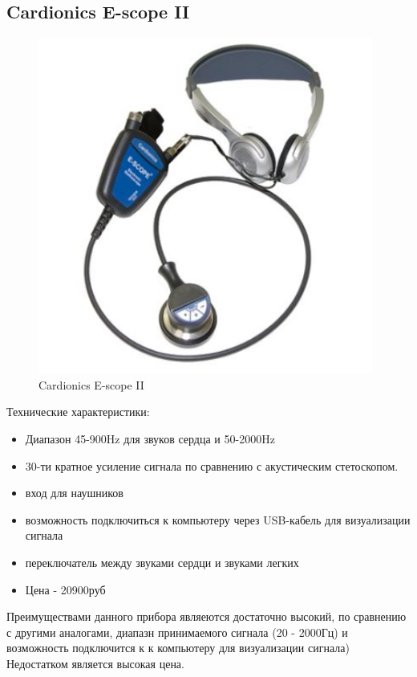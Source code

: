 \documentclass[../paper.tex]{subfiles}
\begin{document}
\subsection{Cardionics E-scope II}
\begin{figure}[H]
\centering
\includegraphics[width=11cm]{images/e-scope}
\caption{Cardionics E-scope II}
\end{figure}

Технические характеристики:\cite{cardioics}
\begin{itemize}
  \item Диапазон 45-900Hz для звуков сердца и 50-2000Hz
  \item 30-ти кратное усиление сигнала по сравнению с акустическим стетоскопом.
  \item вход для наушников
  \item возможность подключиться к компьютеру через USB-кабель для визуализации сигнала
  \item переключатель между звуками сердци и звуками легких
  \item Цена - 20900руб
\end{itemize}

Преимуществами данного прибора являеются достаточно высокий, по сравнению с другими аналогами, диапазн принимаемого сигнала (20 - 2000Гц) и возможность подключится к к компьютеру для визуализации сигнала) Недостатком является высокая цена.
\end{document}
